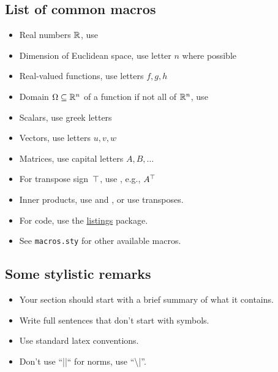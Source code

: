 \documentclass[12pt]{article}
\begin{document}
\subsection*{List of common macros}

\begin{itemize}
\item Real numbers $\mathbb{R}$, use 
\item Dimension of Euclidean space, use letter $n$ where possible
\item Real-valued functions, use letters $f, g, h$
\item Domain $\Omega\subseteq\mathbb{R}^n$ of a function if not all of $\mathbb{R}^n$, use 
\item Scalars, use greek letters
\item Vectors, use letters $u, v, w$
\item Matrices, use capital letters $A, B, \dots$
\item For transpose sign~$\top$, use , e.g., $A^\top$
\item Inner products, use  and , or use transposes.
\item For code, use the \href{https://en.wikibooks.org/wiki/LaTeX/Source_Code_Listings}{listings} package.
\item See {\tt macros.sty} for other available macros.
\end{itemize}

\subsection{Some stylistic remarks}

\begin{itemize}
\item Your section should start with a brief summary of what it contains.
\item Write full sentences that don't start with symbols.
\item Use standard latex conventions.
\item Don't use ``||`` for norms, use ``\textbackslash |''.
\end{itemize}
\end{document}
